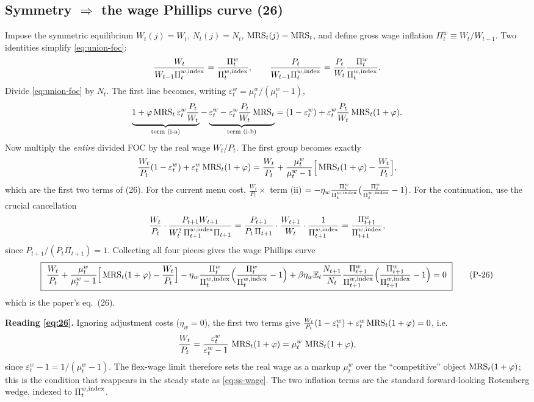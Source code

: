 \subsection{Symmetry \texorpdfstring{$\Rightarrow$}{=>} the wage Phillips curve (26)}
Impose the symmetric equilibrium $W_t(j)=W_t$, $N_t(j)=N_t$, $\operatorname{MRS}_t(j)=\operatorname{MRS}_t$, and define gross wage
inflation $\Pi^w_t\equiv W_t/W_{t-1}$. Two identities simplify \eqref{eq:union-foc}:
\[
\frac{W_t}{W_{t-1}\Pi^{w,\text{index}}_t}=\frac{\Pi^w_t}{\Pi^{w,\text{index}}_t},\qquad
\frac{P_t}{W_{t-1}\Pi^{w,\text{index}}_t}=\frac{P_t}{W_t}\frac{\Pi^w_t}{\Pi^{w,\text{index}}_t}.
\]
Divide \eqref{eq:union-foc} by $N_t$. The first line becomes, writing $\varepsilon^w_t=\mu^w_t/(\mu^w_t-1)$,
\[
\underbrace{1+\varphi\operatorname{MRS}_t\varepsilon^w_t\frac{P_t}{W_t}}_{\text{term (i-a)}}
-\underbrace{\varepsilon^w_t-\varepsilon^w_t\frac{P_t}{W_t}\operatorname{MRS}_t}_{\text{term (i-b)}}
=(1-\varepsilon^w_t)+\varepsilon^w_t\frac{P_t}{W_t}\operatorname{MRS}_t(1+\varphi).
\]
Now multiply the \emph{entire} divided FOC by the real wage $W_t/P_t$. The first group becomes exactly
\begin{equation}\label{eq:pc-static}
\frac{W_t}{P_t}(1-\varepsilon^w_t)+\varepsilon^w_t\operatorname{MRS}_t(1+\varphi)
=\frac{W_t}{P_t}+\frac{\mu^w_t}{\mu^w_t-1}\Big[\operatorname{MRS}_t(1+\varphi)-\frac{W_t}{P_t}\Big],
\end{equation}
which are the first two terms of (26). For the current menu cost, $\tfrac{W_t}{P_t}\times$ term (ii)
$=-\eta_w\frac{\Pi^w_t}{\Pi^{w,\text{index}}_t}\big(\frac{\Pi^w_t}{\Pi^{w,\text{index}}_t}-1\big)$. For the
continuation, use the crucial cancellation
\[
\frac{W_t}{P_t}\cdot\frac{P_{t+1}W_{t+1}}{W_t^2\,\Pi^{w,\text{index}}_{t+1}\Pi_{t+1}}
=\frac{P_{t+1}}{P_t\,\Pi_{t+1}}\cdot\frac{W_{t+1}}{W_t}\cdot\frac{1}{\Pi^{w,\text{index}}_{t+1}}
=\frac{\Pi^w_{t+1}}{\Pi^{w,\text{index}}_{t+1}},
\]
since $P_{t+1}/(P_t\Pi_{t+1})=1$. Collecting all four pieces gives the wage Phillips curve
\begin{equation}\label{eq:26}
\boxed{\ \frac{W_t}{P_t}+\frac{\mu^w_t}{\mu^w_t-1}\Big[\MRS_t(1+\varphi)-\frac{W_t}{P_t}\Big]
-\eta_w\frac{\Pi^w_t}{\Pi^{w,\Ind}_t}\Big(\frac{\Pi^w_t}{\Pi^{w,\Ind}_t}-1\Big)
+\beta\eta_w\E_t\frac{N_{t+1}}{N_t}\frac{\Pi^w_{t+1}}{\Pi^{w,\Ind}_{t+1}}\Big(\frac{\Pi^w_{t+1}}{\Pi^{w,\Ind}_{t+1}}-1\Big)=0\ }
\tag{P-26}
\end{equation}
which is the paper's eq.\ (26).

\medskip\noindent
\textbf{Reading \eqref{eq:26}.} Ignoring adjustment costs ($\eta_w=0$), the first two terms give
$\tfrac{W_t}{P_t}(1-\varepsilon^w_t)+\varepsilon^w_t\operatorname{MRS}_t(1+\varphi)=0$, i.e.
\[
\frac{W_t}{P_t}=\frac{\varepsilon^w_t}{\varepsilon^w_t-1}\,\operatorname{MRS}_t(1+\varphi)=\mu^w_t\,\operatorname{MRS}_t(1+\varphi),
\]
since $\varepsilon^w_t-1=1/(\mu^w_t-1)$. The flex-wage limit therefore sets the real wage as a markup
$\mu^w_t$ over the ``competitive'' object $\operatorname{MRS}_t(1+\varphi)$; this is the condition that reappears in
the steady state as \eqref{eq:ss-wage}. The two inflation terms are the standard forward-looking
Rotemberg wedge, indexed to $\Pi^{w,\text{index}}_t$.

